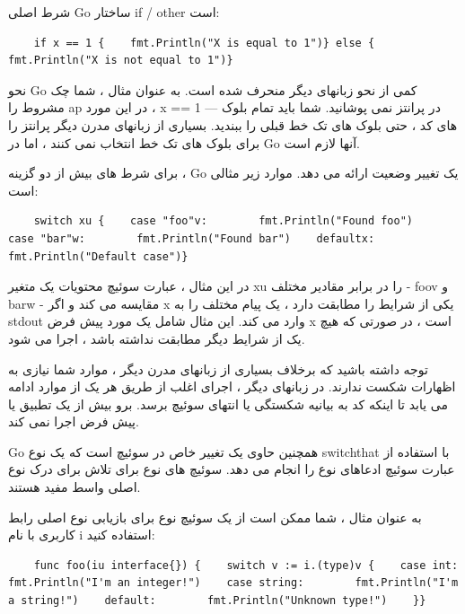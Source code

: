 \documentclass[12pt]{book}
\begin{document}
شرط اصلی Go ساختار if / other است:
\begin{latin}
	\begin{lstlisting}
	if x == 1 {    fmt.Println("X is equal to 1")} else {    fmt.Println("X is not equal to 1")}
	\end{lstlisting}
\end{latin}

نحو Go کمی از نحو زبانهای دیگر منحرف شده است. به عنوان مثال ، شما چک مشروط را ap در این مورد ، x == 1 — در پرانتز نمی پوشانید. شما باید تمام بلوک های کد ، حتی بلوک های تک خط قبلی را ببندید. بسیاری از زبانهای مدرن دیگر پرانتز را برای بلوک های تک خط انتخاب نمی کنند ، اما در Go آنها لازم است.

برای شرط های بیش از دو گزینه ، Go یک تغییر وضعیت ارائه می دهد. موارد زیر مثالی است:
\begin{latin}
	\begin{lstlisting}
	switch xu {    case "foo"v:        fmt.Println("Found foo")    case "bar"w:        fmt.Println("Found bar")    defaultx:        fmt.Println("Default case")}
	\end{lstlisting}
\end{latin}

در این مثال ، عبارت سوئیچ محتویات یک متغیر xu را در برابر مقادیر مختلف - foov و barw - مقایسه می کند و اگر x یکی از شرایط را مطابقت دارد ، یک پیام مختلف را به stdout وارد می کند. این مثال شامل یک مورد پیش فرض x است ، در صورتی که هیچ یک از شرایط دیگر مطابقت نداشته باشد ، اجرا می شود.

توجه داشته باشید که برخلاف بسیاری از زبانهای مدرن دیگر ، موارد شما نیازی به اظهارات شکست ندارند. در زبانهای دیگر ، اجرای اغلب از طریق هر یک از موارد ادامه می یابد تا اینکه کد به بیانیه شکستگی یا انتهای سوئیچ برسد. برو بیش از یک تطبیق یا پیش فرض اجرا نمی کند.

Go همچنین حاوی یک تغییر خاص در سوئیچ است که یک نوع switchthat با استفاده از عبارت سوئیچ ادعاهای نوع را انجام می دهد. سوئیچ های نوع برای تلاش برای درک نوع اصلی واسط مفید هستند.

به عنوان مثال ، شما ممکن است از یک سوئیچ نوع برای بازیابی نوع اصلی رابط کاربری با نام i استفاده کنید:
\begin{latin}
	\begin{lstlisting}
	func foo(iu interface{}) {    switch v := i.(type)v {    case int:        fmt.Println("I'm an integer!")    case string:        fmt.Println("I'm a string!")    default:        fmt.Println("Unknown type!")    }}
	\end{lstlisting}
\end{latin}
\end{document}

